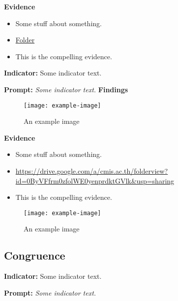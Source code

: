 \documentclass{report}
\begin{document}
\noindent\textbf{Evidence}
\vspace{-\topsep}

\begin{itemize}[leftmargin=*]
\setlength{\parskip}{0pt}
\setlength{\itemsep}{0pt plus 1pt}
\item Some stuff about something.
\item \href{https://drive.google.com/a/cmis.ac.th/folderview?id=0ByVFfrm0zfolWE0yenprdktGVlk&usp=sharing}{Folder}
\item This is the compelling evidence.
\end{itemize}

\noindent\textbf{Indicator:} Some indicator text.

\noindent\textbf{Prompt:} \textit{Some indicator text.}
\noindent\textbf{Findings}

\blindtext

\blinditemize[6]

\blindtext

\begin{figure}[h!]
\caption[An example image]{An example image}
\centering
\texttt{[image: example-image]}
\end{figure}


\noindent\textbf{Evidence}
\vspace{-\topsep}

\begin{itemize}[leftmargin=*]
\setlength{\parskip}{0pt}
\setlength{\itemsep}{0pt plus 1pt}
\item Some stuff about something.
\item \url{https://drive.google.com/a/cmis.ac.th/folderview?id=0ByVFfrm0zfolWE0yenprdktGVlk&usp=sharing}
\item This is the compelling evidence.
\end{itemize}

\begin{figure}[h!]
\caption[An example image]{An example image}
\centering
\texttt{[image: example-image]}
\end{figure}


\subsection{Congruence}
\blindtext

\blindtext
 
\noindent\textbf{Indicator:} Some indicator text.

\noindent\textbf{Prompt:} \textit{Some indicator text.}
\end{document}
